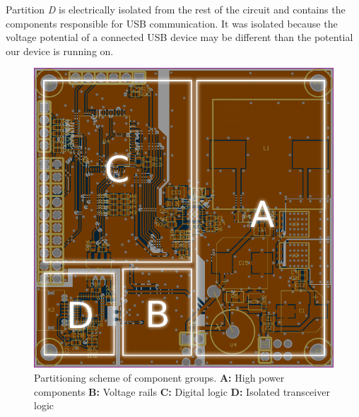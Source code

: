 Partition \emph{D} is  electrically  isolated  from  the rest of the circuit and
contains  the  components responsible for USB  communication.  It  was  isolated
because the  voltage  potential  of a connected USB device may be different than
the potential our device is running on.

\begin{figure}[th!]
    \centering
    \includegraphics[width=.45\linewidth]{images/pcb/partitioning.png}
    \caption{Partitioning scheme of component groups.
        \textbf{A:} High power components
        \textbf{B:} Voltage rails
        \textbf{C:} Digital logic
        \textbf{D:} Isolated transceiver logic
    }
    \label{fig:pcb:partitioning}
\end{figure}

